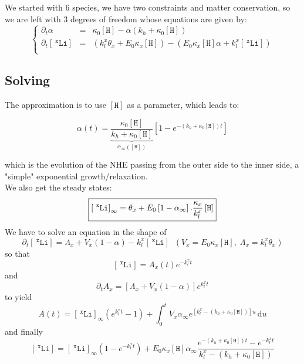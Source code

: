 \documentclass[aps,onecolumn,11pt]{revtex4}
\newcommand{\mychem}[1]{\mathtt{#1}}
\newcommand{\myconc}[1]{\left\lbrack{#1}\right\rbrack}
\newcommand{\spLi}[1]{{~^{\mychem{#1}}\mychem{Li}}}
\newcommand{\Li}[1]{\myconc{\spLi{#1}}}
\newcommand{\spproton}{\mychem{H}}
\newcommand{\proton}{\myconc{\spproton}}
\begin{document}
We started with 6 species, we have two constraints and matter conservation, so we are left with 3 degrees of freedom whose equations are given by:
\begin{equation}
\boxed{
\left\lbrace
\begin{array}{rcl}
	\partial_t \alpha  & = & \kappa_0 \proton - \alpha \left(k_h + \kappa_0 \proton\right)\\
	\partial_t \Li{x}  & = & \left(k_l^x \theta_x + E_0\kappa_x \proton\right) -  \left(E_0\kappa_x \proton \alpha +k_l^x \Li{x}\right)\\
\end{array}
\right.
}
\end{equation}

\subsection{Solving}

The approximation is to use $\proton$ as a parameter, which leads to:

\begin{equation}
\boxed{
	\alpha(t) = \underbrace{\dfrac{\kappa_0 \proton}{k_h + \kappa_0 \proton}}_{\alpha_\infty\left(\proton\right)}\left[1-e^{\displaystyle-\left(k_h+\kappa_0\proton\right)t}  \right]
	}
\end{equation}

which is the evolution of the NHE passing from the outer side to the inner side, a "simple" exponential growth/relaxation.\\
We also get the steady states:
\begin{equation}
\boxed{
	\label{eq:LiInf}
	\Li{x}_\infty = \theta_x + E_0 \left[1-\alpha_\infty\right].\dfrac{\kappa_x}{k_l^x} \proton
	}
\end{equation}
We have to solve an equation in the shape of
\begin{equation}
	\partial_t \Li{x} = \Lambda_x + V_x \left(1-\alpha\right) - k_l^x \Li{x} \;\; (V_x = E_0 \kappa_x \proton,\;\Lambda_x = k_l^x \theta_x)
\end{equation}
so that
\begin{equation}
	\Li{x} = A_x(t) e^{-k_l^x t}
\end{equation}
and
\begin{equation}
	\partial_t A_x = \left[ \Lambda_x + V_x \left(1-\alpha\right) \right] e^{ k_l^x t}
\end{equation}
to yield
\begin{equation}
	A(t) = \Li{x}_\infty \left(e^{ k_l^x t } - 1 \right)
	+ \int_0^t V_x\alpha_\infty e^{ \left[ k_l^x - (k_h+\kappa_0\proton)\right] u} \, \mathrm{d} u
\end{equation}
and finally
\begin{equation}
\boxed{
	\Li{x} = \Li{x}_\infty \left(1-e^{ -k_l^x t }\right) + 
	E_0 \kappa_x \proton \alpha_\infty \dfrac{e^{-(k_h+\kappa_0\proton)t} - e^{-k_l^xt} }{k_l^x - (k_h+\kappa_0\proton)}
	}
\end{equation}
\end{document}
